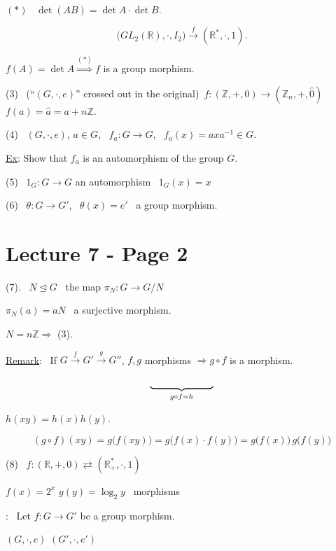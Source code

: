\noindent $(*)$ \ $\det(AB) = \det A\cdot \det B$.

\[
\big(GL_2(\mathbb{R}),\cdot,I_2\big) \xrightarrow{\ f\ } (\mathbb{R}^*,\cdot,1).
\]

\noindent $f(A) = \det A \overset{(*)}{\Longrightarrow} f$ is a group morphism.

\bigskip
\noindent (3) \ \footnotesize (``$(G,\cdot,e)$'' crossed out in the original)\normalsize \ $f:(\mathbb{Z},+,0) \to (\mathbb{Z}_n,+,\hat 0)$ \quad $f(a)=\hat a = a+n\mathbb{Z}$.

\bigskip
\noindent (4) \ $(G,\cdot,e)$, $a\in G$, \ $f_a:G\to G$, \ $f_a(x)=axa^{-1}\in G$.

\noindent\underline{Ex}: Show that $f_a$ is an automorphism of the group $G$.

\bigskip
\noindent (5) \ $1_G: G\to G$ an automorphism \ $1_G(x)=x$

\bigskip
\noindent (6) \ $\theta:G\to G'$, \ $\theta(x)=e'$ \ a group morphism.



\section*{Lecture 7 - Page 2}

\noindent (7). \ $N\trianglelefteq G$ \ the map $\pi_N: G\to G/N$

\noindent $\pi_N(a)=aN$ \ a surjective morphism.

\bigskip
\noindent $N=n\mathbb{Z} \Rightarrow$ (3).

\bigskip
\noindent\underline{Remark}: \ If $G \xrightarrow{f} G' \xrightarrow{g} G''$, $f,g$ morphisms $\Rightarrow g\circ f$ is a morphism.

\[
\underbrace{\hphantom{G \xrightarrow{f} G' \xrightarrow{g} G''}}_{g\circ f = h}
\]

\noindent $h(xy) = h(x)h(y)$.

\[
(g\circ f)(xy) = g\big(f(xy)\big) = g\big(f(x)\cdot f(y)\big) = g\big(f(x)\big)\,g\big(f(y)\big)
\]

\bigskip
\noindent (8) \ $f:(\mathbb{R},+,0) \rightleftarrows (\mathbb{R}_+^*,\cdot,1)$

\noindent $f(x)=2^x$ \qquad $g(y)=\log_2 y$ \ morphisms

\bigskip
\noindent{}: \ Let $f:G\to G'$ be a group morphism.

\noindent $(G,\cdot,e)$ \qquad $(G',\cdot,e')$

